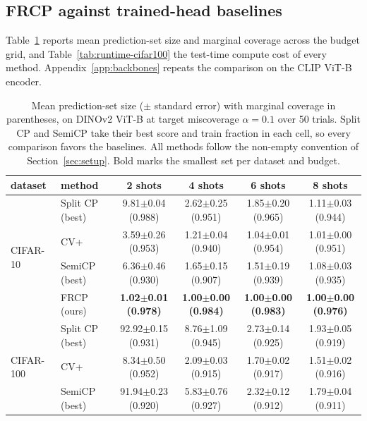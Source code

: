 \subsection{FRCP against trained-head baselines}
\label{sec:headline}
Table~\ref{tab:headline-main} reports mean prediction-set size and
marginal coverage across the budget grid, and
Table~\ref{tab:runtime-cifar100} the test-time compute cost of every
method. Appendix~\ref{app:backbones} repeats the comparison on the
CLIP ViT-B encoder.
\begin{table}[t]
\caption{Mean prediction-set size ($\pm$ standard error) with marginal
coverage in parentheses, on DINOv2 ViT-B at target miscoverage
$\alpha = 0.1$ over 50 trials. Split CP and SemiCP take their best
score and train fraction in each cell, so every comparison favors the
baselines. All methods follow the non-empty convention of
Section~\ref{sec:setup}. Bold marks the smallest set per dataset and
budget.}
\label{tab:headline-main}
\begin{center}
\small
\setlength{\tabcolsep}{4pt}
\begin{tabular}{llcccc}
\toprule
dataset & method & 2 shots & 4 shots & 6 shots & 8 shots\\
\midrule
\multirow{4}{*}{CIFAR-10} & Split CP (best) & 9.81$\pm$0.04 {\scriptsize(0.988)} & 2.62$\pm$0.25 {\scriptsize(0.951)} & 1.85$\pm$0.20 {\scriptsize(0.965)} & 1.11$\pm$0.03 {\scriptsize(0.944)}\\
 & CV+ & 3.59$\pm$0.26 {\scriptsize(0.953)} & 1.21$\pm$0.04 {\scriptsize(0.940)} & 1.04$\pm$0.01 {\scriptsize(0.954)} & 1.01$\pm$0.00 {\scriptsize(0.951)}\\
 & SemiCP (best) & 6.36$\pm$0.46 {\scriptsize(0.930)} & 1.65$\pm$0.15 {\scriptsize(0.907)} & 1.51$\pm$0.19 {\scriptsize(0.939)} & 1.08$\pm$0.03 {\scriptsize(0.935)}\\
 & FRCP (ours) & \textbf{1.02$\pm$0.01 {\scriptsize(0.978)}} & \textbf{1.00$\pm$0.00 {\scriptsize(0.984)}} & \textbf{1.00$\pm$0.00 {\scriptsize(0.983)}} & \textbf{1.00$\pm$0.00 {\scriptsize(0.976)}}\\
\midrule
\multirow{4}{*}{CIFAR-100} & Split CP (best) & 92.92$\pm$0.15 {\scriptsize(0.931)} & 8.76$\pm$1.09 {\scriptsize(0.945)} & 2.73$\pm$0.14 {\scriptsize(0.925)} & 1.93$\pm$0.05 {\scriptsize(0.919)}\\
 & CV+ & 8.34$\pm$0.50 {\scriptsize(0.952)} & 2.09$\pm$0.03 {\scriptsize(0.915)} & 1.70$\pm$0.02 {\scriptsize(0.917)} & 1.51$\pm$0.02 {\scriptsize(0.916)}\\
 & SemiCP (best) & 91.94$\pm$0.23 {\scriptsize(0.920)} & 5.83$\pm$0.76 {\scriptsize(0.927)} & 2.32$\pm$0.12 {\scriptsize(0.912)} & 1.79$\pm$0.04 {\scriptsize(0.911)}\\

\end{tabular}
\end{center}
\end{table}

